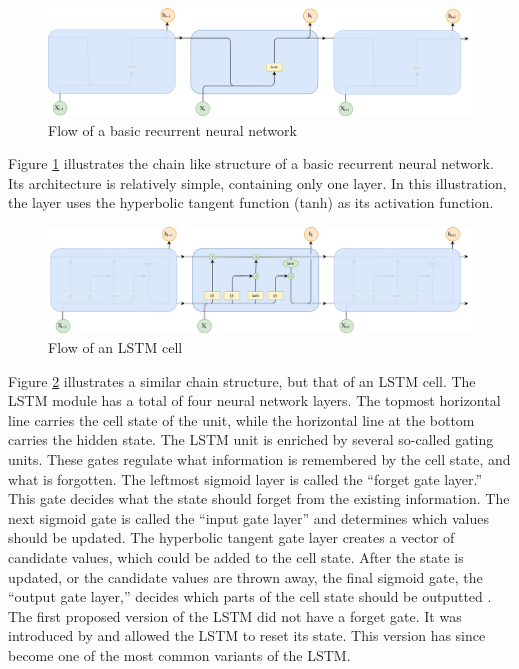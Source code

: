\begin{figure}[ht]
    \centering
    \includegraphics[width=1\textwidth]{fig/related_work/rnn_flow.png}
    \caption{Flow of a basic recurrent neural network}
    \label{fig:nn-rnn-flow}
\end{figure}

Figure \ref{fig:nn-rnn-flow} illustrates the chain like structure of a basic recurrent neural network. Its architecture is relatively simple, containing only one layer. In this illustration, the layer uses the hyperbolic tangent function (tanh) as its activation function.

\begin{figure}[ht]
    \centering
    \includegraphics[width=1\textwidth]{fig/related_work/lstm_flow.png}
    \caption{Flow of an LSTM cell}
    \label{fig:nn-lstm-flow}
\end{figure}

Figure \ref{fig:nn-lstm-flow} illustrates a similar chain structure, but that of an LSTM cell. The LSTM module has a total of four neural network layers. The topmost horizontal line carries the cell state of the unit, while the horizontal line at the bottom carries the hidden state. The LSTM unit is enriched by several so-called gating units. These gates regulate what information is remembered by the cell state, and what is forgotten. The leftmost sigmoid layer is called the ``forget gate layer.'' This gate decides what the state should forget from the existing information. The next sigmoid gate is called the ``input gate layer'' and determines which values should be updated. The hyperbolic tangent gate layer creates a vector of candidate values, which could be added to the cell state. After the state is updated, or the candidate values are thrown away, the final sigmoid gate, the ``output gate layer,'' decides which parts of the cell state should be outputted \citep{hochreiter1997long, goodfellow2016deeplearning, olah2015lstm, gers2002learning}. The first proposed version of the LSTM did not have a forget gate. It was introduced by \cite{gers2000learning} and allowed the LSTM to reset its state. This version has since become one of the most common variants of the LSTM.

